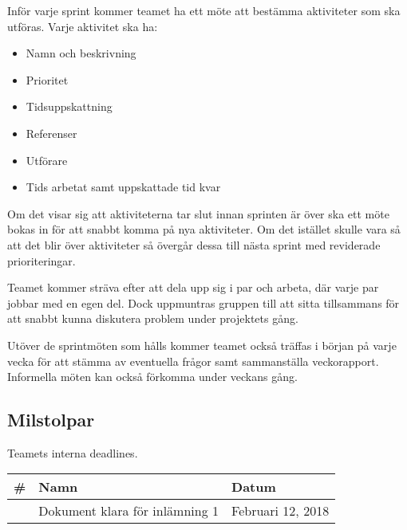 Inför varje sprint kommer teamet ha ett möte att bestämma aktiviteter som ska utföras. Varje aktivitet ska ha: \begin{itemize}
    \item Namn och beskrivning
    \item Prioritet
    \item Tidsuppskattning
    \item Referenser
    \item Utförare
    \item Tids arbetat samt uppskattade tid kvar
\end{itemize}
Om det visar sig att aktiviteterna tar slut innan sprinten är över ska ett möte bokas in för att snabbt komma på nya aktiviteter. Om det istället skulle vara så att det blir över aktiviteter så övergår dessa till nästa sprint med reviderade prioriteringar.

Teamet kommer sträva efter att dela upp sig i par och arbeta, där varje par jobbar med en egen del. Dock uppmuntras
gruppen till att sitta tillsammans för att snabbt kunna diskutera problem under projektets gång.

Utöver de sprintmöten som hålls kommer teamet också träffas i början på varje vecka för att stämma av eventuella frågor samt sammanställa veckorapport. Informella möten kan också förkomma under veckans gång.

\subsection{Milstolpar}
Teamets interna deadlines.

\begin{center}
    \begin{tabular}{| l | l | l | }
        \hline
        \textbf{\#} & \textbf{Namn} & \textbf{Datum} \\
        \hline
        \centering 1 & Dokument klara för inlämning 1 & Februari 12, 2018\\
        \hline
    \end{tabular}
\end{center}

